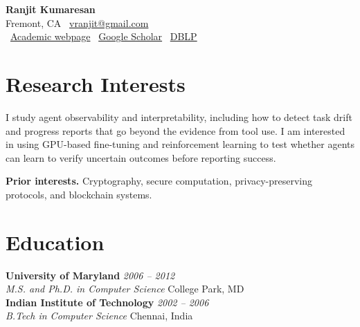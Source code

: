 \documentclass[11pt]{article}
\newcommand{\entry}[4]{
    \noindent\textbf{#1} \hfill \textit{#2} \\
    \noindent\textit{#3} \hfill #4 \\
}
\begin{document}
\begin{center}
    \LARGE\textbf{Ranjit Kumaresan} \\
    \vspace{1mm}
    \normalsize
    Fremont, CA \quad \faEnvelope\ \href{mailto:vranjit@gmail.com}{vranjit@gmail.com} \\
    \faGlobe\ \href{https://vranjit27.github.io/}{Academic webpage} \quad
    \faGoogle\ \href{https://scholar.google.com/citations?user=YC3Ab4oAAAAJ&hl=en}{Google Scholar} \quad
    \faDatabase\ \href{https://dblp.org/pid/14/4245.html}{DBLP}
\end{center}

\vspace{-3mm}

\section{Research Interests}
I study agent observability and interpretability, including how to detect task drift and progress reports that go beyond the evidence from tool use. I am interested in using GPU-based fine-tuning and reinforcement learning to test whether agents can learn to verify uncertain outcomes before reporting success.

\textbf{Prior interests.} Cryptography, secure computation, privacy-preserving protocols, and blockchain systems.

\section{Education}
\entry{University of Maryland}{2006 – 2012}{M.S. and Ph.D. in Computer Science}{College Park, MD}
\entry{Indian Institute of Technology}{2002 – 2006}{B.Tech in Computer Science}{Chennai, India}

\vspace{-5mm}

\end{document}
